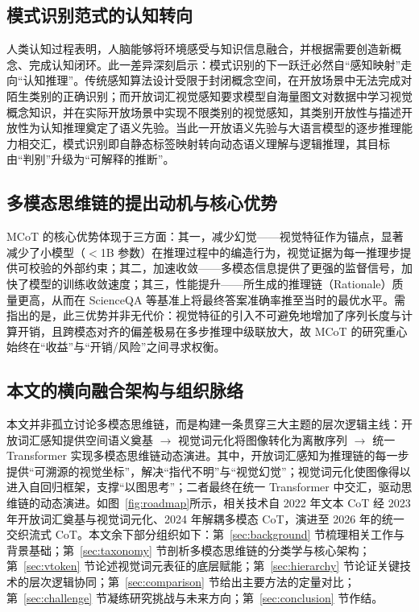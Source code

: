 \documentclass[twocolumn]{ctexart}
\newcommand{\mcot}{MCoT}  %
\begin{document}
\subsection{模式识别范式的认知转向}\label{sec:intro:shift}
人类认知过程表明，人脑能够将环境感受与知识信息融合，并根据需要创造新概念、完成认知闭环。此一差异深刻启示：模式识别的下一跃迁必然自“感知映射”走向“认知推理”。传统感知算法设计受限于封闭概念空间，在开放场景中无法完成对陌生类别的正确识别；而开放词汇视觉感知要求模型自海量图文对数据中学习视觉概念知识，并在实际开放场景中实现不限类别的视觉感知，其类别开放性与描述开放性为认知推理奠定了语义先验。当此一开放语义先验与大语言模型的逐步推理能力相交汇，模式识别即自静态标签映射转向动态语义理解与逻辑推理，其目标由“判别”升级为“可解释的推断”。

\subsection{多模态思维链的提出动机与核心优势}\label{sec:intro:motiv}
\mcot{} 的核心优势体现于三方面：其一，减少幻觉——视觉特征作为锚点，显著减少了小模型（$<$1B 参数）在推理过程中的编造行为，视觉证据为每一推理步提供可校验的外部约束；其二，加速收敛——多模态信息提供了更强的监督信号，加快了模型的训练收敛速度；其三，性能提升——所生成的推理链（Rationale）质量更高，从而在 ScienceQA 等基准上将最终答案准确率推至当时的最优水平\cite{zhang2023mcot}。需指出的是，此三优势并非无代价：视觉特征的引入不可避免地增加了序列长度与计算开销，且跨模态对齐的偏差极易在多步推理中级联放大，故 \mcot{} 的研究重心始终在“收益”与“开销/风险”之间寻求权衡。

\subsection{本文的横向融合架构与组织脉络}\label{sec:intro:outline}
本文并非孤立讨论多模态思维链，而是构建一条贯穿三大主题的层次逻辑主线：开放词汇感知提供空间语义奠基 $\rightarrow$ 视觉词元化将图像转化为离散序列 $\rightarrow$ 统一 Transformer 实现多模态思维链动态演进。其中，开放词汇感知为推理链的每一步提供“可溯源的视觉坐标”，解决“指代不明”与“视觉幻觉”；视觉词元化使图像得以进入自回归框架，支撑“以图思考”；二者最终在统一 Transformer 中交汇，驱动思维链的动态演进。如图~\ref{fig:roadmap}所示，相关技术自 2022 年文本 CoT 经 2023 年开放词汇奠基与视觉词元化、2024 年解耦多模态 CoT，演进至 2026 年的统一交织流式 CoT。本文余下部分组织如下：第~\ref{sec:background} 节梳理相关工作与背景基础；第~\ref{sec:taxonomy} 节剖析多模态思维链的分类学与核心架构；第~\ref{sec:vtoken} 节论述视觉词元表征的底层赋能；第~\ref{sec:hierarchy} 节论证关键技术的层次逻辑协同；第~\ref{sec:comparison} 节给出主要方法的定量对比；第~\ref{sec:challenge} 节凝练研究挑战与未来方向；第~\ref{sec:conclusion} 节作结。
\end{document}

